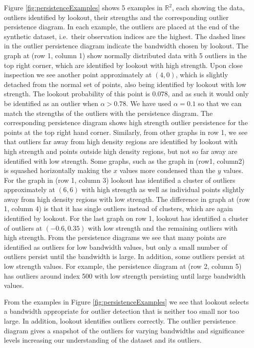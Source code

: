 \documentclass[11pt,a4paper,]{article}
\theoremstyle{definition}
\theoremstyle{definition}
\theoremstyle{definition}
\theoremstyle{remark}
\begin{document}
Figure \ref{fig:persistenceExamples} shows 5 examples in \(\mathbb{R}^2\), each showing the data, outliers identified by lookout, their strengths and the corresponding outlier persistence diagram. In each example, the outliers are placed at the end of the synthetic dataset, i.e.~their observation indices are the highest. The dashed lines in the outlier persistence diagram indicate the bandwidth chosen by lookout. The graph at (row 1, column 1) show normally distributed data with 5 outliers in the top right corner, which are identified by lookout with high strength. Upon close inspection we see another point approximately at \((4,0)\), which is slightly detached from the normal set of points, also being identified by lookout with low strength. The lookout probability of this point is \(0.078\), and as such it would only be identified as an outlier when \(\alpha > 0.78\). We have used \(\alpha = 0.1\) so that we can match the strengths of the outliers with the persistence diagram. The corresponding persistence diagram shows high strength outlier persistence for the points at the top right hand corner. Similarly, from other graphs in row 1, we see that outliers far away from high density regions are identified by lookout with high strength and points outside high density regions, but not so far away are identified with low strength. Some graphs, such as the graph in (row1, column2) is squashed horizontally making the \(x\) values more condensed than the \(y\) values. For the graph in (row 1, column 3) lookout has identified a cluster of outliers approximately at \((6,6)\) with high strength as well as individual points slightly away from high density regions with low strength. The difference in graph at (row 1, column 4) is that it has single outliers instead of clusters, which are again identified by lookout. For the last graph on row 1, lookout has identified a cluster of outliers at \((-0.6, 0.35)\) with low strength and the remaining outliers with high strength. From the persistence diagrams we see that many points are identified as outliers for low bandwidth values, but only a small number of outliers persist until the bandwidth is large. In addition, some outliers persist at low strength values. For example, the persistence diagram at (row 2, column 5) has outliers around index 500 with low strength persisting until large bandwidth values.

From the examples in Figure \ref{fig:persistenceExamples} we see that lookout selects a bandwidth appropriate for outlier detection that is neither too small nor too large. In addition, lookout identifies outliers correctly. The outlier persistence diagram gives a snapshot of the outliers for varying bandwidths and significance levels increasing our understanding of the dataset and its outliers.
\end{document}
